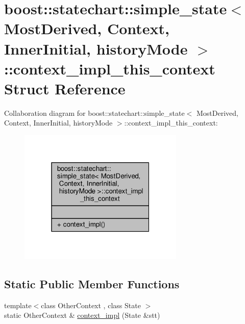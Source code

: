 \hypertarget{structboost_1_1statechart_1_1simple__state_1_1context__impl__this__context}{}\section{boost\+:\+:statechart\+:\+:simple\+\_\+state$<$ Most\+Derived, Context, Inner\+Initial, history\+Mode $>$\+:\+:context\+\_\+impl\+\_\+this\+\_\+context Struct Reference}
\label{structboost_1_1statechart_1_1simple__state_1_1context__impl__this__context}


Collaboration diagram for boost\+:\+:statechart\+:\+:simple\+\_\+state$<$ Most\+Derived, Context, Inner\+Initial, history\+Mode $>$\+:\+:context\+\_\+impl\+\_\+this\+\_\+context\+:
\nopagebreak
\begin{figure}[H]
\begin{center}
\leavevmode
\includegraphics[width=223pt]{structboost_1_1statechart_1_1simple__state_1_1context__impl__this__context__coll__graph}
\end{center}
\end{figure}
\subsection*{Static Public Member Functions}
\begin{DoxyCompactItemize}
\item 
{\footnotesize template$<$class Other\+Context , class State $>$ }\\static Other\+Context \& \mbox{\hyperlink{structboost_1_1statechart_1_1simple__state_1_1context__impl__this__context_a7d23c2a5945c1b8d1ede03bdb893e69a}{context\+\_\+impl}} (State \&stt)
\end{DoxyCompactItemize}


